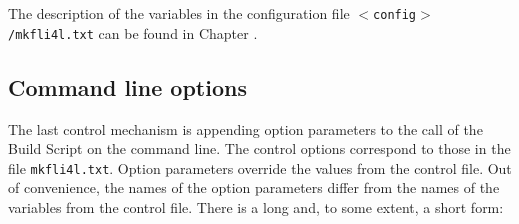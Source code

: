   The description of the variables in the configuration file
  \texttt{$<$config$>$/mkfli4l.txt} can be found in Chapter
  .

  \subsection{Command line options}
  The last control mechanism is appending option parameters
  to the call of the Build Script on the command line.
  The control options correspond to those in the file \texttt{mkfli4l.txt}.
  Option parameters override the values from the control file.
  Out of convenience, the names of the option parameters differ from the names of
  the variables from the control file. There is a long and, to some extent, a
  short form:

